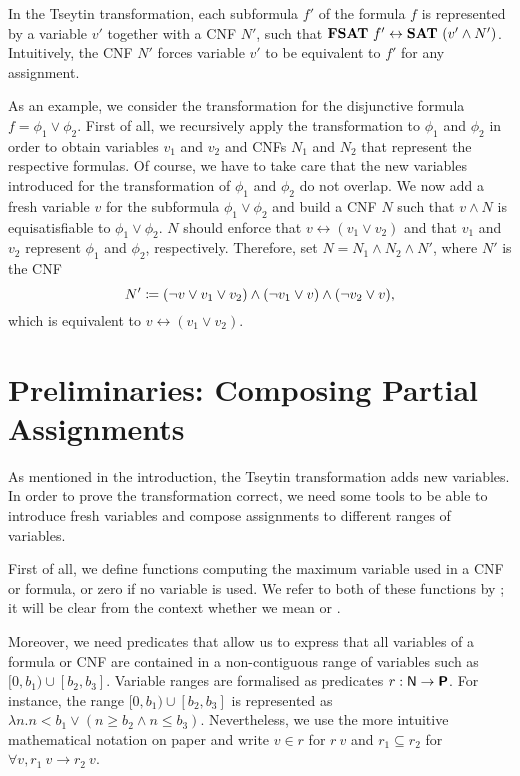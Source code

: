 In the Tseytin transformation, each subformula $f'$ of the formula $f$ is represented by a variable $v'$ together with a CNF $N'$, such that $\textbf{FSAT}{}~f' \leftrightarrow \textbf{SAT}{}~(v' \land N')$. Intuitively, the CNF $N'$ forces variable $v'$ to be equivalent to $f'$ for any assignment.
\begin{example}
  As an example, we consider the transformation for the disjunctive formula $f = \phi_1 \lor \phi_2$. First of all, we recursively apply the transformation to $\phi_1$ and $\phi_2$ in order to obtain variables $v_1$ and $v_2$ and CNFs $N_1$ and $N_2$ that represent the respective formulas. Of course, we have to take care that the new variables introduced for the transformation of $\phi_1$ and $\phi_2$ do not overlap.
  We now add a fresh variable $v$ for the subformula $\phi_1 \lor \phi_2$ and build a CNF $N$ such that $v \land N$ is equisatisfiable to $\phi_1 \lor \phi_2$. $N$ should enforce that $v \leftrightarrow (v_1 \lor v_2)$ and that $v_1$ and $v_2$ represent $\phi_1$ and $\phi_2$, respectively.
  Therefore, set $N = N_1 \land N_2 \land N'$, where $N'$ is the CNF 
  \[ N' \coloneqq (\lnot v \lor v_1 \lor v_2) \land (\lnot v_1  \lor v) \land (\lnot v_2 \lor v), \]
  which is equivalent to $v \leftrightarrow (v_1 \lor v_2)$.
\end{example}

\section{Preliminaries: Composing Partial Assignments}\label{sec:tseytin_prelim}
As mentioned in the introduction, the Tseytin transformation adds new variables. In order to prove the transformation correct, we need some tools to be able to introduce fresh variables and compose assignments to different ranges of variables.

First of all, we define functions computing the maximum variable used in a CNF or formula, or zero if no variable is used. We refer to both of these functions by \mnotec{\maxVar{}}; it will be clear from the context whether we mean 
%
or . 

\newcommand{\inlit}{\ensuremath{\in_{\textsf{lit}}}}
\newcommand{\inclause}{\ensuremath{\in_{\textsf{clause}}}}
\newcommand{\incnf}{\ensuremath{\in_{\textsf{cnf}}}}
\newcommand{\infor}{\ensuremath{\in_{\formula}}}
Moreover, we need predicates that allow us to express that all variables of a formula
or CNF are contained in a non-contiguous range of variables such as $[0, b_1) \cup [b_2, b_3]$. 
Variable ranges are formalised as predicates $r : \mathsf{N} \rightarrow \textsf{\bfseries P}$. For instance, the range $[0, b_1) \cup [b_2, b_3]$ is represented as $\lambda n. n < b_1 \lor (n \ge b_2 \land n \le b_3)$. Nevertheless, we use the more intuitive mathematical notation on paper and write $v \in r$ for $r~v$ and $r_1 \subseteq r_2$ for $\forall v, r_1~v \rightarrow r_2~v$.

